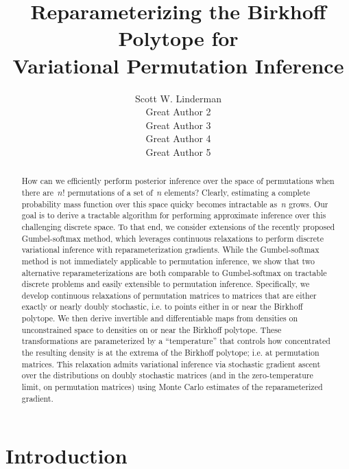 \documentclass{article}
\title{Reparameterizing the Birkhoff Polytope for \\ Variational Permutation Inference}
\author{
  Scott W. Linderman \\
  \And
  Great Author 2 \\
  \And
  Great Author 3 \\
  \And
  Great Author 4 \\
  \And
  Great Author 5 \\
}
\begin{document}
\maketitle

\begin{abstract}
  How can we efficiently perform posterior inference over the space
  of permutations when there are~$n!$ permutations of a set of~$n$
  elements?  Clearly, estimating a complete probability mass function
  over this space quicky becomes intractable as~$n$ grows. Our goal is
  to derive a tractable algorithm for performing approximate inference
  over this challenging discrete space.  To that end, we consider
  extensions of the recently proposed Gumbel-softmax method, which
  leverages continuous relaxations to perform discrete variational
  inference with reparameterization gradients. While the
  Gumbel-softmax method is not immediately applicable to permutation
  inference, we show that two alternative reparameterizations are both
  comparable to Gumbel-softmax on tractable discrete problems and
  easily extensible to permutation inference. Specifically, we develop
  continuous relaxations of permutation matrices to matrices that are
  either exactly or nearly doubly stochastic, i.e. to points either in
  or near the Birkhoff polytope.  We then derive invertible and
  differentiable maps from densities on unconstrained space to
  densities on or near the Birkhoff polytope. These transformations
  are parameterized by a ``temperature'' that controls how
  concentrated the resulting density is at the extrema of the Birkhoff
  polytope; i.e. at permutation matrices.  This relaxation admits
  variational inference via stochastic gradient ascent over the
  distributions on doubly stochastic matrices (and in the
  zero-temperature limit, on permutation matrices) using Monte Carlo
  estimates of the reparameterized gradient.
\end{abstract}

\section{Introduction}
\end{document}
